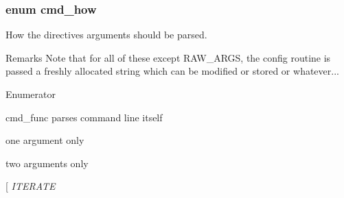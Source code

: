 \subsubsection[{\texorpdfstring{cmd\+\_\+how}{cmd_how}}]{\setlength{\rightskip}{0pt plus 5cm}enum {\bf cmd\+\_\+how}}\hypertarget{group__APACHE__CORE__CONFIG_ga07442bbd6a047ee13383f52b9670b026}{}\label{group__APACHE__CORE__CONFIG_ga07442bbd6a047ee13383f52b9670b026}
How the directives arguments should be parsed. \begin{DoxyRemark}{Remarks}
Note that for all of these except R\+A\+W\+\_\+\+A\+R\+GS, the config routine is passed a freshly allocated string which can be modified or stored or whatever... 
\end{DoxyRemark}
\begin{Desc}
\item[Enumerator]\par
\begin{description}
\item[{\em 
R\+A\+W\+\_\+\+A\+R\+GS\hypertarget{group__APACHE__CORE__CONFIG_gga07442bbd6a047ee13383f52b9670b026a073c760805981925832e4689519ff06d}{}\label{group__APACHE__CORE__CONFIG_gga07442bbd6a047ee13383f52b9670b026a073c760805981925832e4689519ff06d}
}]cmd\+\_\+func parses command line itself \item[{\em 
T\+A\+K\+E1\hypertarget{group__APACHE__CORE__CONFIG_gga07442bbd6a047ee13383f52b9670b026a10617320216c9895ea2d573e5c934098}{}\label{group__APACHE__CORE__CONFIG_gga07442bbd6a047ee13383f52b9670b026a10617320216c9895ea2d573e5c934098}
}]one argument only \item[{\em 
T\+A\+K\+E2\hypertarget{group__APACHE__CORE__CONFIG_gga07442bbd6a047ee13383f52b9670b026a2e783ec7da786bdbc263f43eab3a4b38}{}\label{group__APACHE__CORE__CONFIG_gga07442bbd6a047ee13383f52b9670b026a2e783ec7da786bdbc263f43eab3a4b38}
}]two arguments only \item[{\em 
I\+T\+E\+R\+A\+TE\hypertarget{group__APACHE__CORE__CONFIG_gga07442bbd6a047ee13383f52b9670b026a9dd48567178ca06bf106f81e826a2d24}{}\label{group__APACHE__CORE__CONFIG_gga07442bbd6a047ee13383f52b9670b026a9dd48567178ca06bf106f81e826a2d24}
}
\end{description}
\end{Desc}
